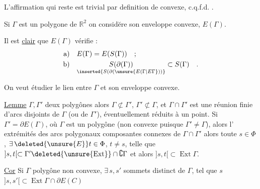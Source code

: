 \margin{$\bullet$}
L'affirmation qui reste est trivial par definition de convexe,  c.q.f.d. .

\margin{$\bullet$}
Si $\Gamma$ est un polygone de $\mathbb{R}^{2}$ on considĕre son enveloppe convexe, $E(\Gamma)$.

Il est \uline{clair} que $E(\Gamma)$ vérifie :
\[
\begin{aligned}
\text{a)}\quad & E(\Gamma)=E(S(\Gamma))\quad;\\
\text{b)}\quad & \underset{\inserted{S(\partial(\unsure{E(\Gamma|E\Gamma}))}}{S(\partial(\Gamma))}\subset S(\Gamma)\quad.
\end{aligned}
\]

On veut étudier le lien entre $\Gamma$ et son enveloppe convexe.

\uline{Lemme}  $\Gamma,\Gamma'$ deux polygônes   alors $\Gamma\not\subset\Gamma'$, $\Gamma'\not\subset\Gamma$, et $\Gamma\cap\Gamma'$ est une réunion finie d'arcs disjoints de $\Gamma$ (ou de $\Gamma'$), éventuellement réduits à un point.
Si $\Gamma'=\partial E(\Gamma)$, où $\Gamma$ est un polygône (non convexe puisque $\Gamma'\ne\Gamma$), alors l'  extrémités des arcs polygonaux composantes connexes de $\Gamma\cap\Gamma'$   alors toute  $s\in\Phi$, $\exists\,\deleted{\unsure{E}}t\in\Phi$, $t\ne s$, telle que $]s,t[\subset\Gamma'\deleted{\unsure{\operatorname{Ext}}}\cap\complement\Gamma$ et alors $]s,t[\subset\operatorname{Ext}\Gamma$.


\uline{Cor} Si $\Gamma$ polygône non convexe, $\exists\,s,s'$ sommets distinct de $\Gamma$, tel que $s$  $]s,s'[\subset\operatorname{Ext}\Gamma\cap\partial E(C)$

